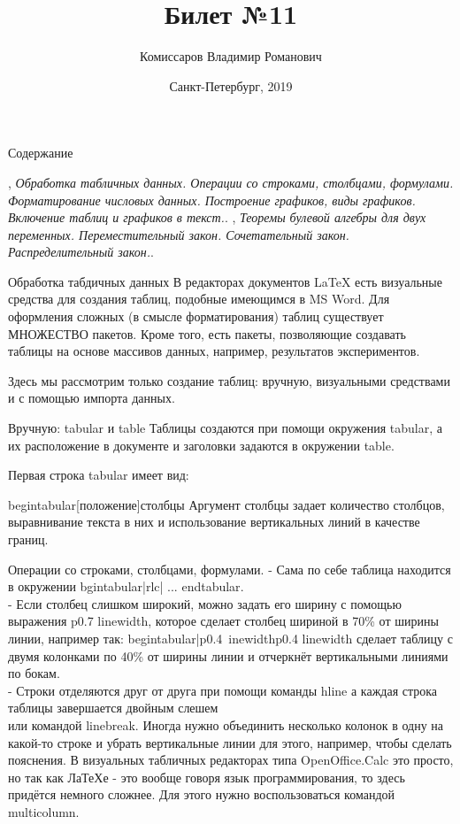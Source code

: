 \documentclass{beamer}
\begin{document}
\title{Билет №11} 
\author{Комиссаров Владимир Романович}
\date{Санкт-Петербург, 2019} 
\frame{\titlepage} 
\begin{frame}{Содержание}
\begin{thebibliography}{10}
\beamertemplatebookbibitems
{}
{}, {\em Обработка табличных данных. Операции со строками, столбцами, формулами. Форматирование числовых данных. Построение графиков, виды графиков. Включение таблиц и графиков в текст.}.
{}, {\em Теоремы булевой алгебры для двух переменных. Переместительный закон. Сочетательный закон. Распределительный закон.}.
\end{thebibliography}
\end{frame}

\begin{frame}{Обработка табдичных данных}
В редакторах документов LaTeX есть визуальные средства для создания таблиц, подобные имеющимся в MS Word. Для оформления сложных (в смысле форматирования) таблиц существует МНОЖЕСТВО пакетов. Кроме того, есть пакеты, позволяющие создавать таблицы на основе массивов данных, например, результатов экспериментов.

Здесь мы рассмотрим только создание таблиц: вручную, визуальными средствами и с помощью импорта данных.

Вручную: tabular и table
Таблицы создаются при помощи окружения tabular, а их расположение в документе и заголовки задаются в окружении table.

Первая строка tabular имеет вид:

begin{tabular}[положение]{столбцы}
Аргумент столбцы задает количество столбцов, выравнивание текста в них и использование вертикальных линий в качестве границ. 
\end{frame}

\begin{frame}{Операции со строками, столбцами, формулами.}
- Сама по себе таблица находится в окружении bgin{tabular}{|rlc|} ... end{tabular}.\\
- Если столбец слишком широкий, можно задать его ширину с помощью выражения p{0.7 linewidth}, которое сделает столбец шириной в 70\% от ширины линии, например так: begin{tabular}{|p{0.4\ inewidth}p{0.4 linewidth}} сделает таблицу с двумя колонками по 40\% от ширины линии и отчеркнёт вертикальными линиями по бокам.\\
- Строки отделяются друг от друга при помощи команды  hline а каждая строка таблицы завершается двойным слешем \\ или командой  linebreak.
Иногда нужно объединить несколько колонок в одну на какой-то строке и убрать вертикальные линии для этого, например, чтобы сделать пояснения. В визуальных табличных редакторах типа OpenOffice.Calc это просто, но так как ЛаТеХе - это вообще говоря язык программирования, то здесь придётся немного сложнее. Для этого нужно воспользоваться командой multicolumn.
\end{frame}
\end{document}
